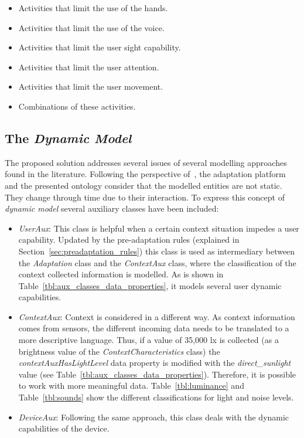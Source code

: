 \begin{itemize}
 \item Activities that limit the use of the hands.
 \item Activities that limit the use of the voice.
 \item Activities that limit the user sight capability.
 \item Activities that limit the user attention.
 \item Activities that limit the user movement.
 \item Combinations of these activities.
\end{itemize}

\subsection{The \textit{Dynamic Model}}
\label{sec:dynamic_model}

The proposed solution addresses several issues of several modelling approaches
found in the literature. Following the perspective of~\citet{fischer_user_2001},
the adaptation platform and the presented ontology consider that the modelled 
entities are not static. They change through time due to their interaction. To 
express this concept of \textit{dynamic model} several auxiliary classes have been
included:

\begin{itemize}
 \item \textit{UserAux}: This class is helpful when a certain context situation
 impedes a user capability. Updated by the pre-adaptation rules (explained
 in Section~\ref{sec:preadaptation_rules}) this class is used as intermediary 
 between the \textit{Adaptation} class and the \textit{ContextAux} class, where 
 the classification of the context collected information is modelled. As is 
 shown in Table~\ref{tbl:aux_classes_data_properties}, it models several user
 dynamic capabilities.
 
 \item \textit{ContextAux}: Context is considered in a different way. As context
 information comes from sensors, the different incoming data needs to be translated
 to a more descriptive language. Thus, if a value of 35,000 \ac{lx} is collected (as
 a brightness value of the \textit{ContextCharacteristics} class) the
 \textit{contextAuxHasLightLevel} data property is modified with the \textit{direct\_sunlight} 
 value (see Table~\ref{tbl:aux_classes_data_properties}). Therefore, it is possible to work
 with more meaningful data. Table~\ref{tbl:luminance} and Table~\ref{tbl:sounds} 
 show the different classifications for light and noise levels.
 
 \item \textit{DeviceAux}: Following the same approach, this class deals with the
 dynamic capabilities of the device.
\end{itemize}

